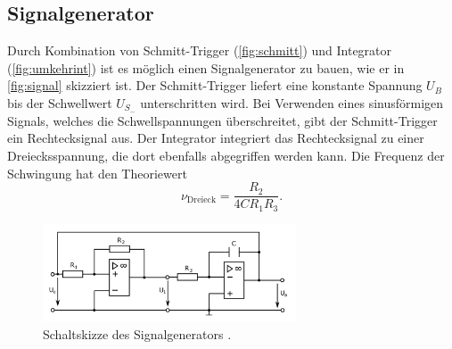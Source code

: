\subsection{Signalgenerator}
Durch Kombination von Schmitt-Trigger (\autoref{fig:schmitt}) und Integrator (\autoref{fig:umkehrint})
ist es möglich einen Signalgenerator zu bauen, wie er in \autoref{fig:signal} skizziert ist.
Der Schmitt-Trigger liefert eine konstante Spannung $U_B$ bis der Schwellwert $U_{S_{-}}$
unterschritten wird. Bei Verwenden eines sinusförmigen Signals, welches die Schwellspannungen überschreitet,
gibt der Schmitt-Trigger
ein Rechtecksignal aus. Der Integrator integriert das Rechtecksignal zu einer Dreiecksspannung, die dort 
ebenfalls abgegriffen werden kann. Die Frequenz der Schwingung hat den Theoriewert\cite{anleitung}
\begin{equation*}
    \nu_{\text{Dreieck}} = \frac{R_2}{4 C R_1 R_3}.
\end{equation*}
\begin{figure}[H]
    \centering
    \includegraphics[width=0.67\textwidth]{signalgenerator.png}
    \caption{Schaltskizze des Signalgenerators \cite{anleitung}.}
    \label{fig:signal}
\end{figure}

